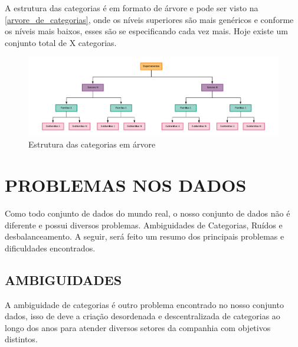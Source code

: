 A estrutura das categorias é em formato de árvore e pode ser visto na \autoref{arvore_de_categorias}, onde os níveis superiores são mais genéricos e conforme os níveis mais baixos, esses são se especificando cada vez mais. Hoje existe um conjunto total de X categorias.

\begin{figure}[htb]
	\caption{\label{arvore_de_categorias} Estrutura das categorias em árvore}
	\begin{center}
	    \includegraphics[scale=0.5]{artigo/recursos/imagens/arvore-de-categorias.png}
	\end{center}
\end{figure}

\section{PROBLEMAS NOS DADOS}

Como todo conjunto de dados do mundo real, o nosso conjunto de dados não é diferente e possui diversos problemas. Ambiguidades de Categorias, Ruídos e desbalanceamento. A seguir, será feito um resumo dos principais problemas e dificuldades encontrados.

\subsection{AMBIGUIDADES}

A ambiguidade de categorias é outro problema encontrado no nosso conjunto dados, isso de deve a criação desordenada e descentralizada de categorias ao longo dos anos para atender diversos setores da companhia com objetivos distintos. 

